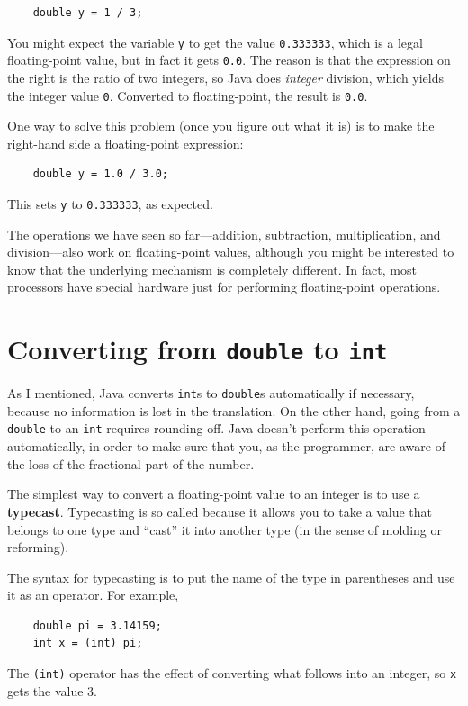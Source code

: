 \documentclass[12pt]{book}
\theoremstyle{exercise}
\begin{document}
\begin{lstlisting}
    double y = 1 / 3;
\end{lstlisting}
%
You might expect the variable {\tt y} to get the value
{\tt 0.333333}, which is a legal floating-point value, but in
fact it gets {\tt 0.0}.  The reason is that the
expression on the right is the ratio of two integers,
so Java does {\em integer} division, which yields the integer
value {\tt 0}.  Converted to floating-point, the result is
{\tt 0.0}.

One way to solve this problem (once you figure out what
it is) is to make the right-hand side a floating-point
expression:

\begin{lstlisting}
    double y = 1.0 / 3.0;
\end{lstlisting}
%
This sets {\tt y} to {\tt 0.333333}, as expected.


The operations we have seen so far---addition, subtraction,
multiplication, and division---also work on floating-point values,
although you might be interested to know that the underlying mechanism
is completely different.  In fact, most processors have special
hardware just for performing floating-point operations.


\section{Converting from {\tt double} to {\tt int}}
\label{rounding}

As I mentioned, Java converts {\tt int}s
to {\tt double}s automatically if necessary, because no
information is lost in the translation.  On the other hand,
going from a {\tt double} to an {\tt int} requires rounding
off.  Java doesn't perform this operation automatically, in
order to make sure that you, as the programmer, are aware
of the loss of the fractional part of the number.

The simplest way to convert a floating-point value to an integer is to
use a {\bf typecast}.  Typecasting is so called because it allows you
to take a value that belongs to one type and ``cast'' it into another
type (in the sense of molding or reforming).

The syntax for typecasting is to put
the name of the type in parentheses and use it as an operator.
For example,

\begin{lstlisting}
    double pi = 3.14159;
    int x = (int) pi;
\end{lstlisting}
%
The {\tt(int)} operator has the effect of converting what
follows into an integer, so {\tt x} gets the value 3.
\end{document}
